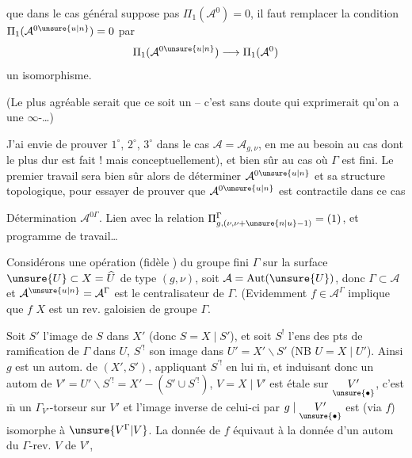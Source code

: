 
 que dans le cas général  suppose pas $\Pi_1(\mathcal A^0)=0$, il faut remplacer la condition $\Pi_1(\mathcal A^{0\unsure{u|n}})=0$ par
\[
\Pi_1(\mathcal A^{0\unsure{u|n}})\longrightarrow\Pi_1(\mathcal A^0)
\]
un isomorphisme.


(Le plus agréable serait que ce soit un  -- c'est  sans doute qui exprimerait qu'on a une $\infty$-\ldots)

J'ai envie de prouver  $1^\circ$, $2^\circ$, $3^\circ$ dans le cas $\mathcal A=\mathcal A_{g,\nu}$, en me  au besoin au cas   dont le plus dur est fait ! \unsure{\}} mais    conceptuellement), et bien sûr au cas où $\Gamma$ est fini. Le premier travail sera bien sûr alors de déterminer $\mathcal A^{0\unsure{u|n}}$ et sa structure topologique, pour essayer de prouver que $\mathcal A^{0\unsure{u|n}}$ est contractile dans ce cas


  Détermination  $\mathcal A^{0\Gamma}$. Lien avec la relation $\Pi_{g,(\nu,\nu+\unsure{n|u}-1)}^\Gamma=(1)$, et programme de travail\ldots

Considérons une opération (fidèle ) du groupe fini $\Gamma$ sur la surface $\unsure{U}\subset X=\widehat U$ de type $(g,\nu)$,  soit $\mathcal A=\operatorname{Aut}(\unsure{U})$, donc $\Gamma\subset\mathcal A$ et $\mathcal A^{\unsure{u|n}}=\mathcal A^\Gamma$ est le centralisateur de $\Gamma$.  (Evidemment $f\in\mathcal A^\Gamma$ implique que $f$    $X$ est un rev. galoisien de groupe $\Gamma$.

Soit $S'$ l'image de $S$ dans $X'$ (donc $S=X\mid S'$), et soit $S^!$ l'ens des pts de ramification de $\Gamma$ dans $U$, $S^{\prime!}$ son image dans $U'=X'\backslash S'$ (NB $U=X\mid U'$). Ainsi $g$ est un autom. de $(X',S')$, appliquant $S^{\prime!}$ en lui $\overline{\mathrm m}$, et  induisant donc un autom de $V'=U'\backslash S^{\prime!}=X'-(S'\cup S^{\prime!})$,     $V=X\mid V'$ est étale sur $\underset{\unsure{\bullet}}{V'}$, c'est $\overline{\mathrm m}$ un $\Gamma_{V'}$-torseur sur $V'$ et l'image inverse de celui-ci par $g\mid\underset{\unsure{\bullet}}{V'}$ est (via $f$) isomorphe à $\unsure{V^\Gamma|V}$. La donnée de $f$ équivaut à la donnée d'un autom du  $\Gamma$-rev. $V$ de $V'$, 


